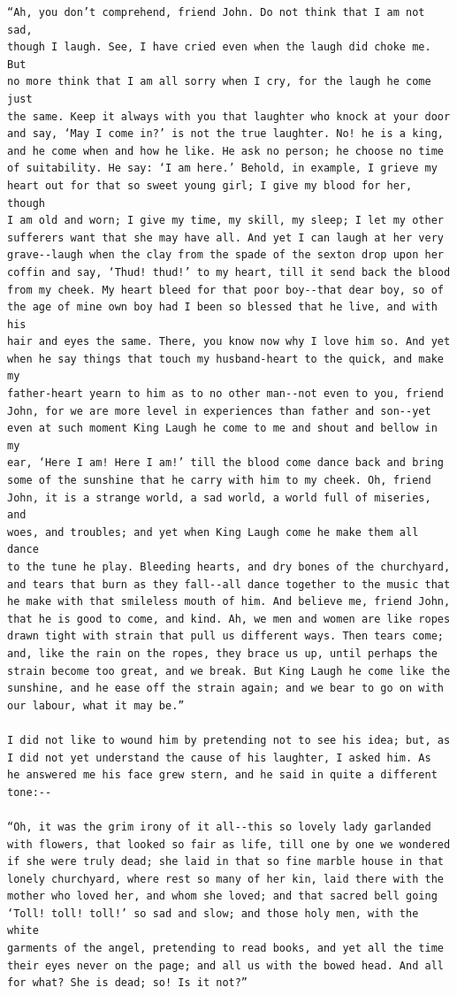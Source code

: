 \documentclass{article}
\begin{document}
\begin{verbatim}
“Ah, you don’t comprehend, friend John. Do not think that I am not sad,
though I laugh. See, I have cried even when the laugh did choke me. But
no more think that I am all sorry when I cry, for the laugh he come just
the same. Keep it always with you that laughter who knock at your door
and say, ‘May I come in?’ is not the true laughter. No! he is a king,
and he come when and how he like. He ask no person; he choose no time
of suitability. He say: ‘I am here.’ Behold, in example, I grieve my
heart out for that so sweet young girl; I give my blood for her, though
I am old and worn; I give my time, my skill, my sleep; I let my other
sufferers want that she may have all. And yet I can laugh at her very
grave--laugh when the clay from the spade of the sexton drop upon her
coffin and say, ‘Thud! thud!’ to my heart, till it send back the blood
from my cheek. My heart bleed for that poor boy--that dear boy, so of
the age of mine own boy had I been so blessed that he live, and with his
hair and eyes the same. There, you know now why I love him so. And yet
when he say things that touch my husband-heart to the quick, and make my
father-heart yearn to him as to no other man--not even to you, friend
John, for we are more level in experiences than father and son--yet
even at such moment King Laugh he come to me and shout and bellow in my
ear, ‘Here I am! Here I am!’ till the blood come dance back and bring
some of the sunshine that he carry with him to my cheek. Oh, friend
John, it is a strange world, a sad world, a world full of miseries, and
woes, and troubles; and yet when King Laugh come he make them all dance
to the tune he play. Bleeding hearts, and dry bones of the churchyard,
and tears that burn as they fall--all dance together to the music that
he make with that smileless mouth of him. And believe me, friend John,
that he is good to come, and kind. Ah, we men and women are like ropes
drawn tight with strain that pull us different ways. Then tears come;
and, like the rain on the ropes, they brace us up, until perhaps the
strain become too great, and we break. But King Laugh he come like the
sunshine, and he ease off the strain again; and we bear to go on with
our labour, what it may be.”

I did not like to wound him by pretending not to see his idea; but, as
I did not yet understand the cause of his laughter, I asked him. As
he answered me his face grew stern, and he said in quite a different
tone:--

“Oh, it was the grim irony of it all--this so lovely lady garlanded
with flowers, that looked so fair as life, till one by one we wondered
if she were truly dead; she laid in that so fine marble house in that
lonely churchyard, where rest so many of her kin, laid there with the
mother who loved her, and whom she loved; and that sacred bell going
‘Toll! toll! toll!’ so sad and slow; and those holy men, with the white
garments of the angel, pretending to read books, and yet all the time
their eyes never on the page; and all us with the bowed head. And all
for what? She is dead; so! Is it not?”


\end{verbatim}
\end{document}
